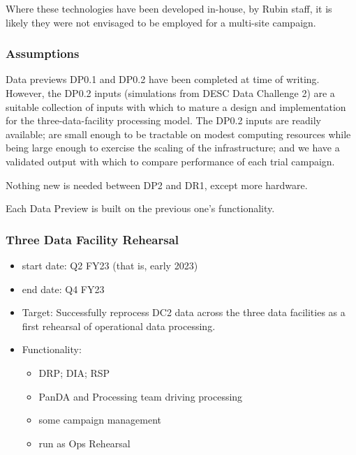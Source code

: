 Where these technologies have been developed in-house, by Rubin staff, it is likely they were not envisaged to be employed for a multi-site campaign.


\subsubsection{Assumptions}

Data previews DP0.1 and DP0.2 have been completed at time of writing. However, the DP0.2 inputs (simulations from DESC Data Challenge 2) are a suitable collection of inputs with which to mature a design and implementation for the three-data-facility processing model. The DP0.2 inputs are readily available; are small enough to be tractable on modest computing resources while being large enough to exercise the scaling of the infrastructure; and we have a validated output with which to compare performance of each trial campaign.

Nothing new is needed between \gls{DP2} and \gls{DR1}, except more
hardware.

Each Data Preview is built on the previous one's functionality.

\subsubsection{Three Data Facility Rehearsal}

\begin{itemize}

\item start date: Q2 \gls{FY23} (that is, early 2023)

\item end date: Q4 \gls{FY23}

\item Target: Successfully reprocess \gls{DC2} data across the three data facilities as a first rehearsal of operational data processing.

\item Functionality:

  \begin{itemize}
    
  \item \gls{DRP}; \gls{DIA}; \gls{RSP}

  \item \gls{PanDA} and Processing team driving processing

  \item some campaign management

  \item run as Ops Rehearsal

  \end{itemize}
  
\end{itemize}

